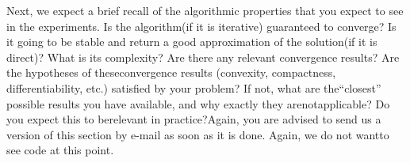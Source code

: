 Next, we expect a brief recall of the algorithmic properties that you expect to see in the experiments. Is the algorithm(if it is iterative) guaranteed to converge? Is it going to be stable and return a good approximation of the solution(if it is direct)? What is its complexity? Are there any relevant convergence results? Are the hypotheses of theseconvergence results (convexity, compactness, differentiability, etc.) satisfied by your problem? If not, what are the“closest” possible results you have available, and why exactly they arenotapplicable?  Do you expect this to berelevant in practice?Again, you are advised to send us a version of this section by e-mail as soon as it is done. Again, we do not wantto see code at this point.
